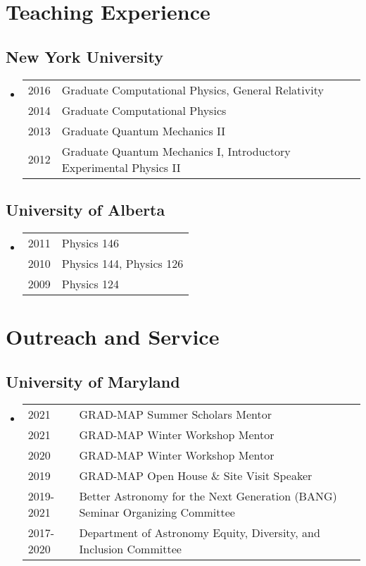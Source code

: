 \begin{itemize}
\end{itemize}

\section*{Teaching Experience}
\subsection*{New York University}
\begin{itemize}
\item \begin{tabular}{ll}
2016 & Graduate Computational Physics, General Relativity \\
2014 & Graduate Computational Physics \\
2013 & Graduate Quantum Mechanics II \\
2012 & Graduate Quantum Mechanics I, Introductory Experimental Physics II
\end{tabular}
\end{itemize}
\subsection*{University of Alberta}
\begin{itemize}
\item \begin{tabular}{ll}
2011 & Physics 146 \\
2010 & Physics 144, Physics 126 \\
2009 & Physics 124 \\
\end{tabular}
\end{itemize}

\section*{Outreach and Service}
\subsection*{University of Maryland}
\begin{itemize}
\item \begin{tabular}{ll}
2021			& GRAD-MAP Summer Scholars Mentor \\
2021			& GRAD-MAP Winter Workshop Mentor \\
2020			& GRAD-MAP Winter Workshop Mentor \\
2019			& GRAD-MAP Open House \& Site Visit Speaker \\
2019-2021	& Better Astronomy for the Next Generation (BANG) Seminar Organizing Committee \\
2017-2020 	& Department of Astronomy Equity, Diversity, and Inclusion Committee
\end{tabular}
\end{itemize}

